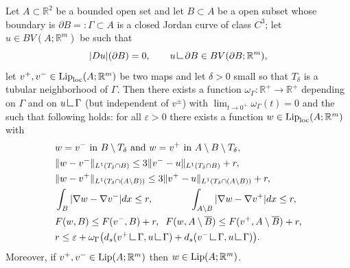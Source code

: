 \documentclass[10pt,a4paper]{amsart}
\newcommand{\R}{\mathbb{R}}
\newcommand{\res}      {\mathop{\hbox{\vrule height 7pt width .5pt depth
                        0pt\vrule height .5pt width 6pt depth 0pt}}\nolimits}
\begin{document}
\begin{lemma}\label{lem_glueing1}
	Let $A\subset\R^2$ be a bounded  open set and let $B\subset A$ be a open subset whose boundary is $\partial B=:\Gamma\subset A$ is a  closed Jordan curve of class $C^3$; let $ u\in BV(A;\R^m)$ be such that $$|Du|(\partial B)=0,\qquad u\res\partial B\in BV(\partial B;\R^m),$$ let $v^+,v^-\in\text{{\rm Lip}}_{\text{{\rm loc}}}(A;\R^m)$ be two maps and let $\delta>0$ small so that $T_\delta$ is a tubular neighborhood of $\Gamma$. Then there exists a function $\omega_\Gamma:\R^+\rightarrow \R^+$ depending on $\Gamma$ and on $u\res \Gamma$ (but independent of $v^\pm$) with $\lim_{t\rightarrow 0^+}\omega_\Gamma(t)=0$ and the such that following holds: for all $\varepsilon>0$ there exists a function $w\in\text{{\rm Lip}}_{\text{{\rm loc}}}(A;\R^m)$ with 
	\begin{align}
	&w=v^-\text{ in }B\setminus T_\delta\text{ and }w=v^+\text{ in }A\setminus B\setminus  T_\delta,\nonumber\\
	&\|w-v^-\|_{L^1(T_\delta\cap B)}\leq 3\|v^--u\|_{L^1(T_\delta\cap B)}+r,\nonumber\\
		&\|w-v^+\|_{L^1(T_\delta\cap (A\setminus B))}\leq 3\|v^+-u\|_{L^1(T_\delta\cap (A\setminus B))}+r,\nonumber\\
		&\int_B|\nabla w-\nabla v^-|dx\leq r,\label{glueingthesis}\qquad \qquad \int_{A\setminus B}|\nabla w-\nabla v^+|dx\leq  r,\\
		&F(w, B)\leq F(v^-, B)+r,\;\; F(w,A\setminus \overline B)\leq F(v^+,A\setminus \overline B)+r,\nonumber\\
		&r\leq\varepsilon+\omega_\Gamma\big(d_s(v^+\res \Gamma,u\res\Gamma)+d_s(v^-\res \Gamma,u\res\Gamma)\big).\nonumber
	\end{align}
Moreover, if $v^+,v^-\in\text{{\rm Lip}}(A;\R^m)$ then $w\in\text{{\rm Lip}}(A;\R^m)$.
\end{lemma}
\end{document}

